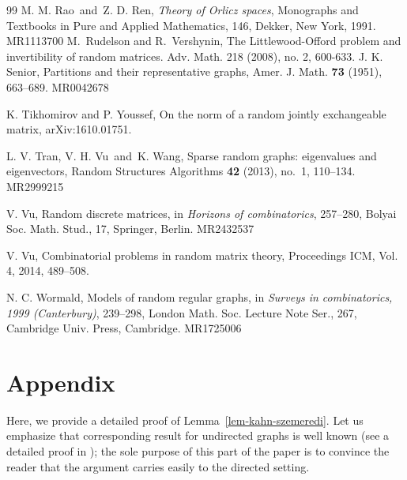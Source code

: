 \documentclass[12pt]{article}
\theoremstyle{definition}
\theoremstyle{plain}
\begin{document}
\begin{thebibliography}{99}
{
M. M. Rao\ and\ Z. D. Ren, {\it Theory of Orlicz spaces}, Monographs and Textbooks in Pure and Applied Mathematics,
146, Dekker, New York, 1991. MR1113700
}
{
M.~Rudelson and  R.~Vershynin, The Littlewood-Offord problem and invertibility of random matrices. Adv. Math. 218 (2008), no. 2, 600-633.
}
{
J. K. Senior, Partitions and their representative graphs, Amer. J. Math. {\bf 73} (1951), 663--689. MR0042678
}

{
K. Tikhomirov and P. Youssef, On the norm of a random jointly exchangeable matrix, arXiv:1610.01751.
}

{
L. V. Tran, V. H. Vu\ and\ K. Wang, Sparse random graphs: eigenvalues and eigenvectors,
Random Structures Algorithms {\bf 42} (2013), no.~1, 110--134. MR2999215
}

{
V. Vu, Random discrete matrices, in {\it Horizons of combinatorics}, 257--280, Bolyai Soc. Math. Stud., 17, Springer, Berlin. MR2432537
}

{
V. Vu, Combinatorial problems in random matrix theory,
Proceedings ICM, Vol. 4, 2014, 489--508.
}

{
N. C. Wormald, Models of random regular graphs, in {\it Surveys in combinatorics, 1999 (Canterbury)},
239--298, London Math. Soc. Lecture Note Ser., 267, Cambridge Univ. Press, Cambridge. MR1725006
}

\end{thebibliography}


\section{Appendix}

Here, we provide a detailed proof of Lemma~\ref{lem-kahn-szemeredi}. Let us emphasize
that corresponding result for undirected graphs is well known (see a detailed proof in \cite{CGJ}); 
the sole purpose of this part of the paper is
to convince the reader that the argument carries easily to the directed setting.
\end{document}
